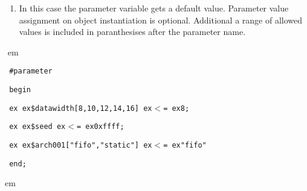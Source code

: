 \documentclass[a4paper,12pt,twoside,english]{article}
\def\s{\hskip 1.15 ex}
\begin{document}
\begin{description}
\begin{enumerate}
\item In this case the parameter variable gets a default value. Parameter value assignment on object instantiation is optional. Additional  a range  of allowed
values is included in paranthesises after the parameter name. 


\end{enumerate}
\item[\colorit{\bf Example}]
\def\prefskipu{}\def\prefskipo{}\def\prefskipa{}\def\prefskipu{\hskip10pt}\def\prefskipo{\hskip10pt}\def\prefskipa{\hskip20pt}\def\content{
\vskip-5pt{\parindent0pt\parbox{\linewidth}{\tt\smallsize\hskip10pt \#parameter}}
\vskip-5pt{\parindent0pt\parbox{\linewidth}{\tt\smallsize\hskip10pt begin}}
\vskip-5pt{\parindent0pt\parbox{\linewidth}{\tt\smallsize\hskip10pt \s \s \$datawidth{[}8,10,12,14,16{]}\s $<$=\s 8;}}
\vskip-5pt{\parindent0pt\parbox{\linewidth}{\tt\smallsize\hskip10pt \s \s \$seed\s $<$=\s 0xffff;}}
\vskip-5pt{\parindent0pt\parbox{\linewidth}{\tt\smallsize\hskip10pt \s \s \$arch001{[}"fifo","static"{]}\s $<$=\s "fifo"}}
\vskip-5pt{\parindent0pt\parbox{\linewidth}{\tt\smallsize\hskip10pt end;}}
}
$ $
 em
\content
{} em

\end{description}

\vskip5pt



\def\thesubsubsection{\vrule width 0pt height 1.3 ex}
\end{document}
